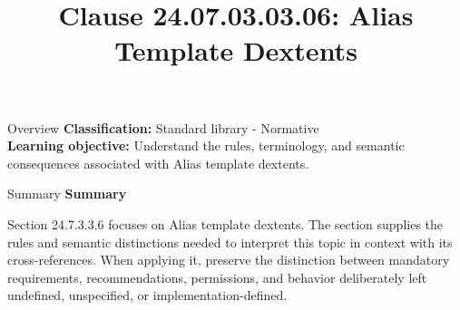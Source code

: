 \documentclass[10pt,letterpaper]{article}
\title{Clause 24.07.03.03.06: Alias Template Dextents}
\author{}
\date{}
\begin{document}
\maketitle
\begin{CornellOverviewBox}{Overview}
\textbf{Classification:} Standard library - Normative\\[2pt]
\textbf{Learning objective:} Understand the rules, terminology, and semantic consequences associated with Alias template dextents.
\end{CornellOverviewBox}\begin{CornellSummaryBox}{Summary}
{\sffamily\bfseries\color{Accent} Summary}\par\vspace{3pt}Section 24.7.3.3.6 focuses on Alias template dextents. The section supplies the rules and semantic distinctions needed to interpret this topic in context with its cross-references. When applying it, preserve the distinction between mandatory requirements, recommendations, permissions, and behavior deliberately left undefined, unspecified, or implementation-defined.
\end{CornellSummaryBox}
\end{document}

